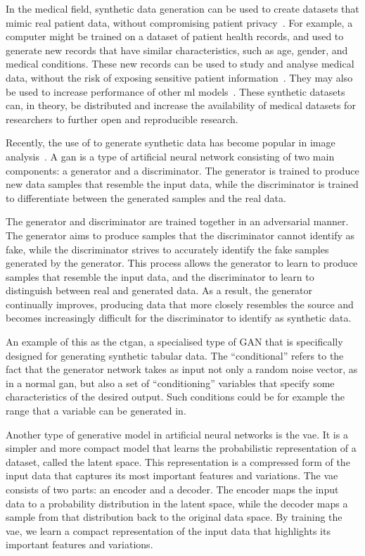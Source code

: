 \documentclass[12pt, a4paper]{article}
\begin{document}
In the medical field, synthetic data generation can be used to create datasets that mimic real patient data, without
compromising patient privacy~\cite{liu_ppgan_2019}. For example, a computer might be trained on a dataset of patient
health records, and used to generate new records that have similar characteristics, such as age, gender, and medical
conditions. These new records can be used to study and analyse medical data, without the risk of exposing sensitive
patient information~\cite{liu_ppgan_2019}. They may also be used to increase performance of other \acrshort{ml}
models~\cite{chen_synthetic_2021}. These synthetic datasets can, in theory, be distributed and increase the
availability of medical datasets for researchers to further open and reproducible research.

Recently, the use of  to generate synthetic data has become popular in image
analysis~\cite{pavan_kumar_generative_2021}. A \acrshort{gan} is a type of artificial neural network consisting of two
main components: a generator and a discriminator. The generator is trained to produce new data samples that resemble
the input data, while the discriminator is trained to differentiate between the generated samples and the real
data.~\cite{pavan_kumar_generative_2021}

The generator and discriminator are trained together in an adversarial manner. The generator aims to produce samples
that the discriminator cannot identify as fake, while the discriminator strives to accurately identify the fake samples
generated by the generator. This process allows the generator to learn to produce samples that resemble the input data,
and the discriminator to learn to distinguish between real and generated data. As a result, the generator continually
improves, producing data that more closely resembles the source and becomes increasingly difficult for the
discriminator to identify as synthetic data.~\cite{pavan_kumar_generative_2021}

An example of this as the \acrfull{ctgan}, a specialised type of GAN that is specifically designed for generating
synthetic tabular data. The ``conditional'' refers to the fact that the generator network takes as input not only a
random noise vector, as in a normal \acrshort{gan}, but also a set of ``conditioning'' variables that specify some
characteristics of the desired output. Such conditions could be for example the range that a variable can be generated
in.~\cite{xu_modeling_2019}

Another type of generative model in artificial neural networks is the \acrfull{vae}. It is a simpler and more compact
model that learns the probabilistic representation of a dataset, called the latent space. This representation is a
compressed form of the input data that captures its most important features and variations. The \acrshort{vae} consists
of two parts: an encoder and a decoder. The encoder maps the input data to a probability distribution in the latent
space, while the decoder maps a sample from that distribution back to the original data space. By training the
\acrshort{vae}, we learn a compact representation of the input data that highlights its important features and
variations.~\cite{kingma_auto-encoding_2013}
\end{document}
